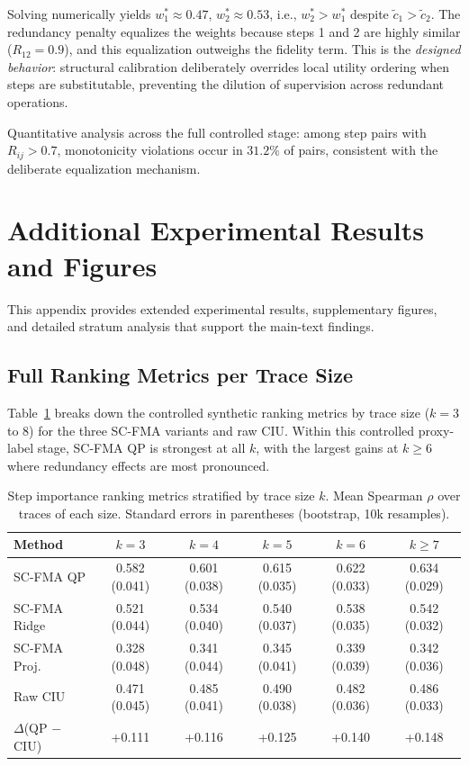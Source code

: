 \documentclass[a4paper,fleqn]{cas-sc}
\begin{document}
Solving numerically yields $w_1^* \approx 0.47$, $w_2^* \approx 0.53$, i.e., $w_2^* > w_1^*$ despite $\tilde{c}_1 > \tilde{c}_2$. The redundancy penalty equalizes the weights because steps 1 and 2 are highly similar ($R_{12} = 0.9$), and this equalization outweighs the fidelity term. This is the \emph{designed behavior}: structural calibration deliberately overrides local utility ordering when steps are substitutable, preventing the dilution of supervision across redundant operations.

Quantitative analysis across the full controlled stage: among step pairs with $R_{ij} > 0.7$, monotonicity violations occur in $31.2\%$ of pairs, consistent with the deliberate equalization mechanism.

\section{Additional Experimental Results and Figures}
\label{app:additional-figures}

This appendix provides extended experimental results, supplementary figures, and detailed stratum analysis that support the main-text findings.

\subsection{Full Ranking Metrics per Trace Size}
\label{app:per-size}

Table~\ref{tab:per-size} breaks down the controlled synthetic ranking metrics by trace size ($k = 3$ to $8$) for the three SC-FMA variants and raw CIU. Within this controlled proxy-label stage, SC-FMA QP is strongest at all $k$, with the largest gains at $k \ge 6$ where redundancy effects are most pronounced.

\begin{table}[ht]
\caption{Step importance ranking metrics stratified by trace size $k$. Mean Spearman $\rho$ over traces of each size. Standard errors in parentheses (bootstrap, 10k resamples).}
\label{tab:per-size}
\centering
\small
\begin{tabular}{lccccc}
\toprule
\textbf{Method} & $k=3$ & $k=4$ & $k=5$ & $k=6$ & $k \ge 7$ \\
\midrule
SC-FMA QP      & 0.582 (0.041) & 0.601 (0.038) & 0.615 (0.035) & 0.622 (0.033) & 0.634 (0.029) \\
SC-FMA Ridge   & 0.521 (0.044) & 0.534 (0.040) & 0.540 (0.037) & 0.538 (0.035) & 0.542 (0.032) \\
SC-FMA Proj.   & 0.328 (0.048) & 0.341 (0.044) & 0.345 (0.041) & 0.339 (0.039) & 0.342 (0.036) \\
Raw CIU        & 0.471 (0.045) & 0.485 (0.041) & 0.490 (0.038) & 0.482 (0.036) & 0.486 (0.033) \\
\midrule
$\Delta$(QP $-$ CIU) & +0.111 & +0.116 & +0.125 & +0.140 & +0.148 \\
\bottomrule
\end{tabular}
\end{table}
\end{document}
